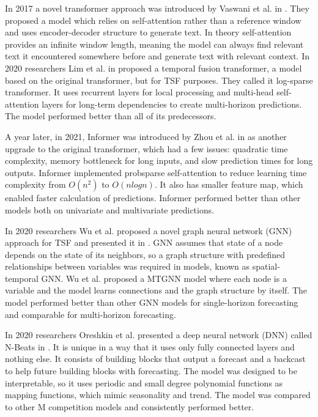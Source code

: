 \documentclass[conference]{IEEEtran}
\begin{document}
In 2017 a novel transformer approach was introduced by Vaswani et al. in \cite{vaswani2017attention}.
They proposed a model which relies on self-attention rather than a reference window and uses encoder-decoder structure to generate text.
In theory self-attention provides an infinite window length, meaning the model can always find relevant text it encountered somewhere before and generate text with relevant context.
In 2020 researchers Lim et al. in \cite{li2020enhancing} proposed a temporal fusion transformer, a model based on the original transformer, but for TSF purposes. They called it log-sparse transformer.
It uses recurrent layers for local processing and multi-head self-attention layers for long-term dependencies to create multi-horizon predictions.
The model performed better than all of its predecessors.

A year later, in 2021, Informer was introduced by Zhou et al. in \cite{zhou2021informer} as another upgrade to the original transformer, which had a few issues: quadratic time complexity, memory bottleneck for long inputs, and slow prediction times for long outputs.
Informer implemented probsparse self-attention to reduce learning time complexity from $O(n^{2})$ to $O(n logn)$.
It also has smaller feature map, which enabled faster calculation of predictions.
Informer performed better than other models both on univariate and multivariate predictions.

In 2020 researchers Wu et al. proposed a novel graph neural network (GNN) approach for TSF and presented it in \cite{wu2020connecting}.
GNN assumes that state of a node depends on the state of its neighbors, so a graph structure with predefined relationships between variables was required in models, known as spatial-temporal GNN.
Wu et al. proposed a MTGNN model where each node is a variable and the model learns connections and the graph structure by itself.
The model performed better than other GNN models for single-horizon forecasting and comparable for multi-horizon forecasting.

In 2020 researchers Oreshkin et al. presented a deep neural network (DNN) called N-Beats in \cite{oreshkin2020nbeats}.
It is unique in a way that it uses only fully connected layers and nothing else.
It consists of building blocks that output a forecast and a backcast to help future building blocks with forecasting.
The model was designed to be interpretable, so it uses periodic and small degree polynomial functions as mapping functions, which mimic seasonality and trend.
The model was compared to other M competition \cite{wikiMcomp} models and consistently performed better.
\end{document}

